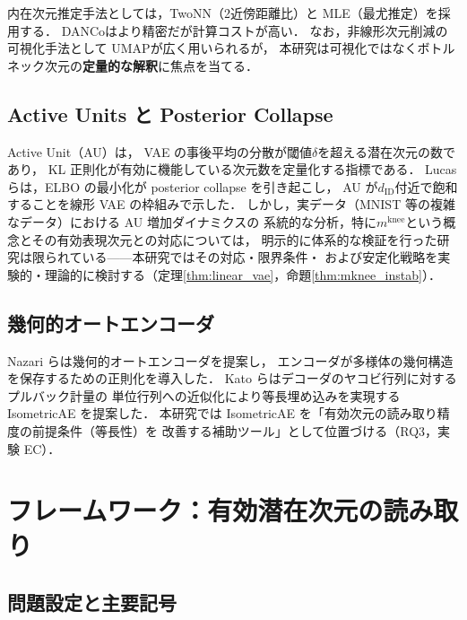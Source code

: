 \documentclass[11pt,a4paper]{jsarticle}
\newcommand{\mknee}{m^{\mathrm{knee}}}
\begin{document}
内在次元推定手法としては，TwoNN\cite{facco2017twonn}（2近傍距離比）と
MLE\cite{levina2005mle}（最尤推定）を採用する．
DANCo\cite{ceruti2014danco}はより精密だが計算コストが高い．
なお，非線形次元削減の可視化手法として UMAP\cite{mcinnes2018umap}が広く用いられるが，
本研究は可視化ではなくボトルネック次元の\textbf{定量的な解釈}に焦点を当てる．

\subsection{Active Units と Posterior Collapse}\label{sec:related_au}

Active Unit（AU）\cite{lucas2019elbo,higgins2017betavae}は，
VAE の事後平均の分散が閾値$\delta$を超える潜在次元の数であり，
KL 正則化が有効に機能している次元数を定量化する指標である．
Lucas ら\cite{lucas2019elbo}は，ELBO の最小化が posterior collapse を引き起こし，
AU が$d_{\mathrm{ID}}$付近で飽和することを線形 VAE の枠組みで示した．
しかし，実データ（MNIST 等の複雑なデータ）における AU 増加ダイナミクスの
系統的な分析，特に$\mknee$という概念とその有効表現次元との対応については，
明示的に体系的な検証を行った研究は限られている——本研究ではその対応・限界条件・
および安定化戦略を実験的・理論的に検討する（定理\ref{thm:linear_vae}，命題\ref{thm:mknee_instab}）．

\subsection{幾何的オートエンコーダ}\label{sec:related_geo}

Nazari ら\cite{nazari2023geometric}は幾何的オートエンコーダを提案し，
エンコーダが多様体の幾何構造を保存するための正則化を導入した．
Kato ら\cite{kato2020rdae}はデコーダのヤコビ行列に対するプルバック計量の
単位行列への近似化により等長埋め込みを実現する IsometricAE を提案した．
本研究では IsometricAE を「有効次元の読み取り精度の前提条件（等長性）を
改善する補助ツール」として位置づける（RQ3，実験 EC）．

\section{フレームワーク：有効潜在次元の読み取り}\label{sec:framework}

\subsection{問題設定と主要記号}\label{sec:framework_setup}
\end{document}
